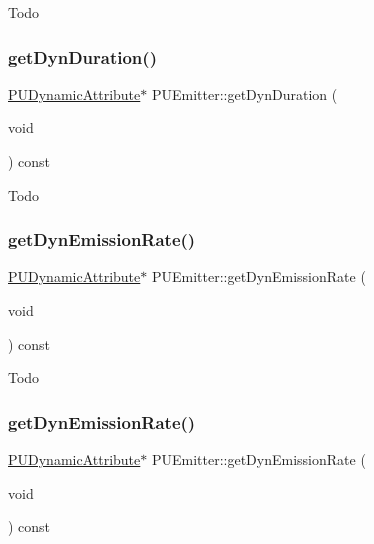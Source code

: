 Todo \mbox{\label{classPUEmitter_a08f852003ae3d3532df40b1425b3466e}} 
\subsubsection{\texorpdfstring{get\+Dyn\+Duration()}{getDynDuration()}\hspace{0.1cm}{\footnotesize\ttfamily [2/2]}}
{\footnotesize\ttfamily \hyperlink{classPUDynamicAttribute}{P\+U\+Dynamic\+Attribute}$\ast$ P\+U\+Emitter\+::get\+Dyn\+Duration (\begin{DoxyParamCaption}\item[{void}]{ }\end{DoxyParamCaption}) const\hspace{0.3cm}{\ttfamily [inline]}}

Todo \mbox{\label{classPUEmitter_a2e7613f45571f856daa10102610dda3f}} 
\subsubsection{\texorpdfstring{get\+Dyn\+Emission\+Rate()}{getDynEmissionRate()}\hspace{0.1cm}{\footnotesize\ttfamily [1/2]}}
{\footnotesize\ttfamily \hyperlink{classPUDynamicAttribute}{P\+U\+Dynamic\+Attribute}$\ast$ P\+U\+Emitter\+::get\+Dyn\+Emission\+Rate (\begin{DoxyParamCaption}\item[{void}]{ }\end{DoxyParamCaption}) const\hspace{0.3cm}{\ttfamily [inline]}}

Todo \mbox{\label{classPUEmitter_a97dc56e1db0253013512450407c87387}} 
\subsubsection{\texorpdfstring{get\+Dyn\+Emission\+Rate()}{getDynEmissionRate()}\hspace{0.1cm}{\footnotesize\ttfamily [2/2]}}
{\footnotesize\ttfamily \hyperlink{classPUDynamicAttribute}{P\+U\+Dynamic\+Attribute}$\ast$ P\+U\+Emitter\+::get\+Dyn\+Emission\+Rate (\begin{DoxyParamCaption}\item[{void}]{ }\end{DoxyParamCaption}) const\hspace{0.3cm}{\ttfamily [inline]}}

